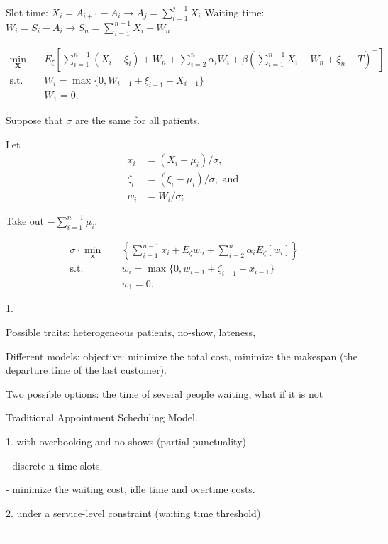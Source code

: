 \documentclass{article}
\begin{document}
Slot time: $X_i = A_{i+1} - A_{i} \rightarrow A_{j} = \sum_{i=1}^{j-1} X_{i}$
Waiting time: $W_{i} = S_{i} - A_{i} \rightarrow S_{n} = \sum_{i=1}^{n-1} X_{i} + W_{n}$

\begin{equation}
    \begin{aligned}
        \min_{\mathbf{X}} \quad & E_{\xi}\left[\sum_{i=1}^{n-1} (X_{i} - \xi_{i}) + W_{n} + \sum_{i=2}^n \alpha_i W_{i} + \beta(\sum_{i=1}^{n-1} X_i + W_n + \xi_{n} -T)^{+} \right] \\
        \mbox{s.t.} \quad & W_{i} = \max\{0, W_{i-1} + \xi_{i-1} - X_{i-1}\} \\
        & W_{1} = 0.
    \end{aligned}
\end{equation}

Suppose that $\sigma$ are the same for all patients.

Let
\begin{align}
    x_i & = \left(X_i- \mu_i \right) / \sigma, \\
    \zeta_i & = \left(\xi_i-\mu_i\right) / \sigma, \text { and } \\
    w_i & = W_i / \sigma;
\end{align}

Take out $- \sum_{i=1}^{n-1} \mu_{i}$.

\begin{equation}
    \begin{aligned}
        \sigma \cdot \min _{\mathbf{x}} \quad & \left\{\sum_{i=1}^{n-1} x_i+ E_{\zeta} w_n + \sum_{i=2}^n \alpha_i E_\zeta\left[w_i\right]\right\} \\
        \mbox{s.t.} \quad & w_{i} = \max\{0, w_{i-1} + \zeta_{i-1} - x_{i-1}\} \\
        & w_{1} = 0.
    \end{aligned}
\end{equation}


1. 


Possible traits: heterogeneous patients, no-show, lateness, 

Different models:  objective: minimize the total cost, minimize the makespan (the departure time of the last customer).


Two possible options: the time of several people waiting, what if it is not 

Traditional Appointment Scheduling Model.

1. with overbooking and no-shows (partial punctuality)

- discrete n time slots.

- minimize the waiting cost, idle time and overtime costs.


2. under a service-level constraint (waiting time threshold)

- 
\end{document}
